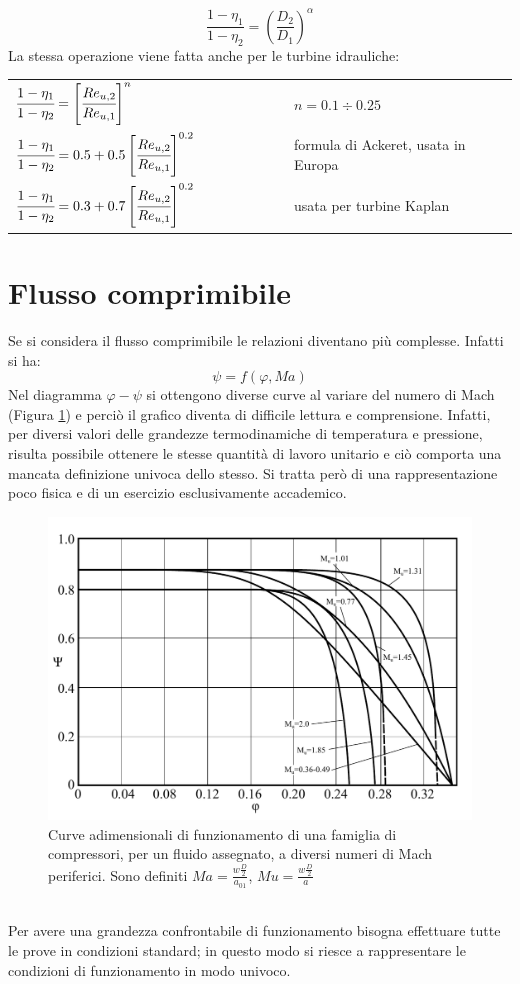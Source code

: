 \begin{equation}
\frac{1-\eta_1}{1-\eta_2} = \left( \frac{D_2}{D_1}\right)^\alpha
\end{equation}
La stessa operazione viene fatta anche per le turbine idrauliche:
\begin{center}
\begin{tabular}{l l l l l l l l}
	$\cfrac{1-\eta_1}{1-\eta_2} = \left[ \cfrac{Re_{u,2}}{Re_{u,1}} \right]^n$ & & & & & & & $n=0.1 \div 0.25$\\
	$\cfrac{1-\eta_1}{1-\eta_2} =0.5 + 0.5 \left[ \cfrac{Re_{u,2}}{Re_{u,1}} \right]^{0.2}$ & & & & & & & formula di Ackeret, usata in Europa\\
	$\cfrac{1-\eta_1}{1-\eta_2} = 0.3 + 0.7 \left[ \cfrac{Re_{u,2}}{Re_{u,1}} \right]^{0.2}$ & & & & & & & usata per turbine Kaplan\\
\end{tabular}
\end{center}
\section{Flusso comprimibile}
Se si considera il flusso comprimibile le relazioni diventano più complesse. Infatti si ha:
\begin{equation}
\psi=f(\varphi,Ma)
\end{equation}
Nel diagramma $\varphi-\psi$ si ottengono diverse curve al variare del numero di Mach (Figura \ref{fig:ComprMach}) e perciò il grafico diventa di difficile lettura e comprensione. Infatti, per diversi valori delle grandezze termodinamiche di temperatura e pressione, risulta possibile ottenere le stesse quantità di lavoro unitario e ciò comporta una mancata definizione univoca dello stesso. Si tratta però di una rappresentazione poco fisica e di un esercizio esclusivamente accademico.
\begin{figure}[h!]
\centering
  \includegraphics[width=.85\textwidth]{fig/ComprMach.pdf}
\caption{Curve adimensionali di funzionamento di una famiglia di compressori, per un fluido assegnato, a diversi numeri di Mach periferici. Sono definiti $Ma = \frac{w \frac{D}{2}}{a_{01}}$, $Mu = \frac{w \frac{D}{2}}{a}$}
\label{fig:ComprMach}
\end{figure}
\\Per avere una grandezza confrontabile di funzionamento bisogna effettuare tutte le prove in condizioni standard; in questo modo si riesce a rappresentare le condizioni di funzionamento in modo univoco.

